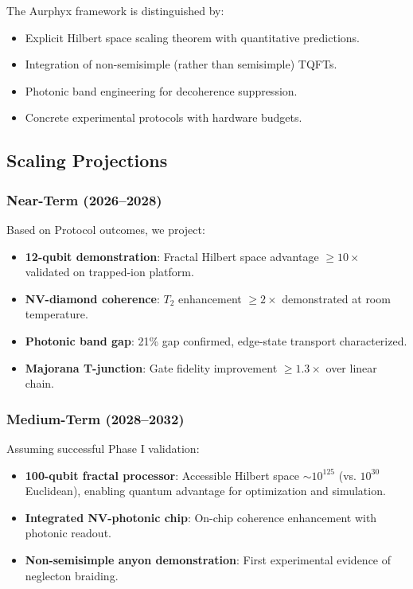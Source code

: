 The Aurphyx framework is distinguished by:
\begin{itemize}
\item Explicit Hilbert space scaling theorem with quantitative predictions.
\item Integration of non-semisimple (rather than semisimple) TQFTs.
\item Photonic band engineering for decoherence suppression.
\item Concrete experimental protocols with hardware budgets.
\end{itemize}

\subsection{Scaling Projections}

\subsubsection{Near-Term (2026--2028)}

Based on Protocol outcomes, we project:
\begin{itemize}
\item \textbf{12-qubit demonstration}: Fractal Hilbert space advantage $\geq 10\times$ validated on trapped-ion platform.
\item \textbf{NV-diamond coherence}: $T_2$ enhancement $\geq 2\times$ demonstrated at room temperature.
\item \textbf{Photonic band gap}: 21\% gap confirmed, edge-state transport characterized.
\item \textbf{Majorana T-junction}: Gate fidelity improvement $\geq 1.3\times$ over linear chain.
\end{itemize}

\subsubsection{Medium-Term (2028--2032)}

Assuming successful Phase I validation:
\begin{itemize}
\item \textbf{100-qubit fractal processor}: Accessible Hilbert space $\sim 10^{125}$ (vs. $10^{30}$ Euclidean), enabling quantum advantage for optimization and simulation.
\item \textbf{Integrated NV-photonic chip}: On-chip coherence enhancement with photonic readout.
\item \textbf{Non-semisimple anyon demonstration}: First experimental evidence of neglecton braiding.
\end{itemize}

